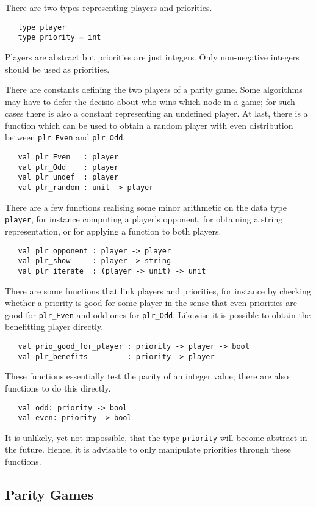 There are two types representing players and priorities.
\begin{verbatim}
   type player 
   type priority = int
\end{verbatim}
Players are abstract but priorities are just integers. Only non-negative integers should be used as priorities.

There are constants defining the two players of a parity game. Some algorithms may have to defer the decisio about who wins which node in a game;
for such cases there is also a constant representing an undefined player. At last, there is a function which can be used to obtain a random player
with even distribution between \verb#plr_Even# and \verb#plr_Odd#.
\begin{verbatim} 
   val plr_Even   : player
   val plr_Odd    : player
   val plr_undef  : player
   val plr_random : unit -> player
\end{verbatim}
There are a few functions realising some minor arithmetic on the data type \verb#player#, for instance computing a player's opponent, for obtaining
a string representation, or for applying a function to both players.
\begin{verbatim}
   val plr_opponent : player -> player
   val plr_show     : player -> string
   val plr_iterate  : (player -> unit) -> unit
\end{verbatim}
There are some functions that link players and priorities, for instance by checking whether a priority is good for some player in the sense that
even priorities are good for \verb#plr_Even# and odd ones for \verb#plr_Odd#. Likewise it is possible to obtain the benefitting player directly.
\begin{verbatim}
   val prio_good_for_player : priority -> player -> bool
   val plr_benefits         : priority -> player
\end{verbatim}
These functions essentially test the parity of an integer value; there are also functions to do this directly. 					
\begin{verbatim}
   val odd: priority -> bool
   val even: priority -> bool
\end{verbatim}
It is unlikely, yet not impossible, that the type \verb#priority# will become abstract in the future. Hence, it is advisable to only manipulate
priorities through these functions.


\subsection{Parity Games}
\label{sec:paritygamesmodule}

